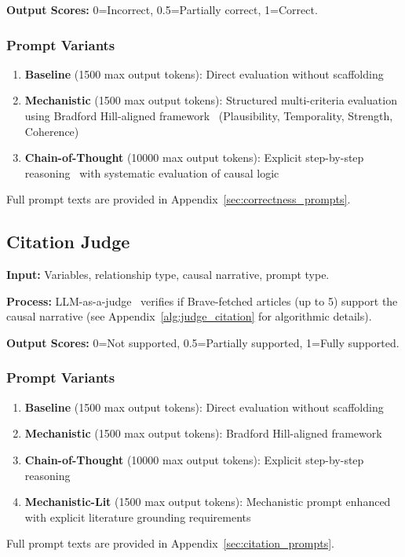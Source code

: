 \textbf{Output Scores:} 0=Incorrect, 0.5=Partially correct, 1=Correct.

\subsubsection{Prompt Variants}
\begin{enumerate}[noitemsep]
    \item \textbf{Baseline} (1500 max output tokens): Direct evaluation without scaffolding
    \item \textbf{Mechanistic} (1500 max output tokens): Structured multi-criteria evaluation using Bradford Hill-aligned framework~\cite{shimonovich2020bradford} (Plausibility, Temporality, Strength, Coherence)
    \item \textbf{Chain-of-Thought} (10000 max output tokens): Explicit step-by-step reasoning~\cite{kojima2022large} with systematic evaluation of causal logic
\end{enumerate}
Full prompt texts are provided in Appendix~\ref{sec:correctness_prompts}.

\subsection{Citation Judge}
\label{sec:citation_judge}

\textbf{Input:} Variables, relationship type, causal narrative, prompt type.

\textbf{Process:} LLM-as-a-judge~\cite{zheng2024llmasajudge} verifies if Brave-fetched articles (up to 5) support the causal narrative (see Appendix~\ref{alg:judge_citation} for algorithmic details).

\textbf{Output Scores:} 0=Not supported, 0.5=Partially supported, 1=Fully supported.

\subsubsection{Prompt Variants}
\begin{enumerate}[noitemsep]
    \item \textbf{Baseline} (1500 max output tokens): Direct evaluation without scaffolding
    \item \textbf{Mechanistic} (1500 max output tokens): Bradford Hill-aligned framework
    \item \textbf{Chain-of-Thought} (10000 max output tokens): Explicit step-by-step reasoning
    \item \textbf{Mechanistic-Lit} (1500 max output tokens): Mechanistic prompt enhanced with explicit literature grounding requirements
\end{enumerate}
Full prompt texts are provided in Appendix~\ref{sec:citation_prompts}.

